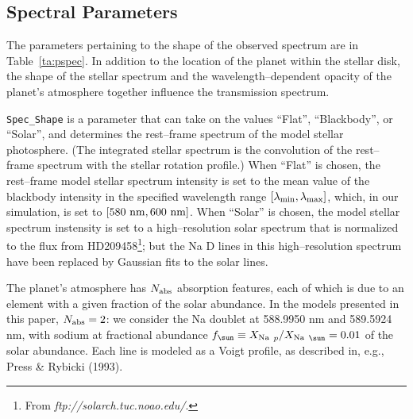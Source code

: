 \documentclass[12pt,preprint]{aastex}
\begin{document}
\subsection{Spectral Parameters}
\label{ssec:pspec}
The parameters pertaining to the shape of the observed spectrum are in
Table~\ref{ta:pspec}.  In addition to the location of the planet within the
stellar disk, the shape of the stellar spectrum and the wavelength--dependent
opacity of the planet's atmosphere together influence the transmission
spectrum.

{\tt Spec\_Shape} is a parameter that can take on the values
``Flat'', ``Blackbody'', or ``Solar'', and determines the rest--frame spectrum
of the model stellar photosphere.  (The integrated stellar spectrum is the
convolution of the rest--frame spectrum with the stellar rotation profile.)
When ``Flat'' is chosen, the rest--frame model stellar spectrum intensity is
set to the mean value of the blackbody intensity in the specified wavelength
range $[\lambda_{\rm min},\lambda_{\rm max}]$, which, in our simulation, is
set to $[580 {\rm~nm}, 600 {\rm~nm}]$.  When ``Solar'' is chosen, the
model stellar spectrum instensity is set to a high--resolution solar spectrum
that is normalized to the flux from
HD209458\footnote{From {\it ftp://solarch.tuc.noao.edu/}.}; but the Na D
lines in this high--resolution spectrum have been replaced by
Gaussian fits to the solar lines.

The planet's atmosphere has $N_{\rm abs}$ absorption features, each of which
is due to an element with a given fraction of the solar abundance.  In
the models presented in this paper, $N_{\rm abs} = 2$: we consider the Na
doublet at 588.9950 nm and 589.5924 nm, with sodium at fractional abundance
$f_\sun \equiv {X_{\rm Na~}}_p / {X_{\rm Na~}}_\sun  = 0.01$ of
the solar abundance.  Each line is modeled as a Voigt profile, as described
in, e.g., Press \& Rybicki (1993).
\end{document}
